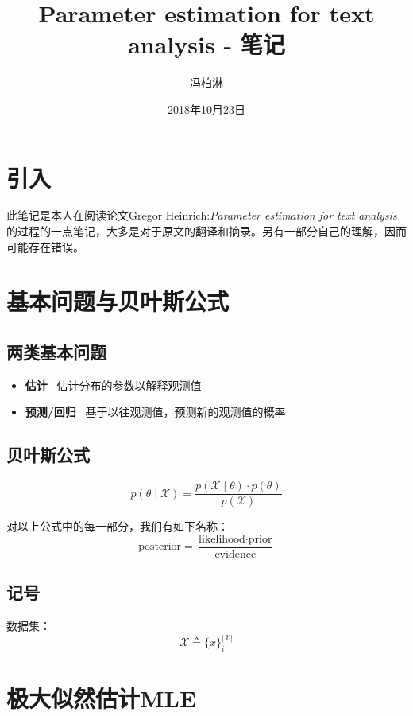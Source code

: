 \documentclass[utf8]{ctexart}
\begin{document}
\title{Parameter estimation for text analysis - 笔记}
\author{冯柏淋}
\date{2018年10月23日}

\maketitle
\tableofcontents
\newpage

\section{引入}
此笔记是本人在阅读论文Gregor Heinrich:\textit{Parameter estimation for text analysis}的过程的一点笔记，大多是对于原文的翻译和摘录。另有一部分自己的理解，因而可能存在错误。

\section{基本问题与贝叶斯公式}

\subsection{两类基本问题}

\begin{itemize}
	\item	\textbf{估计} \, 估计分布的参数以解释观测值 
	\item	\textbf{预测/回归} \, 基于以往观测值，预测新的观测值的概率 
\end{itemize}

\subsection{贝叶斯公式}
\begin{equation}\label{eq1}
p(\theta \mid \mathcal{X} ) = \frac{p(\mathcal{X} \mid \theta) \cdot p(\theta)}{p(\mathcal{X})}
\end{equation}

对以上公式中的每一部分，我们有如下名称：
\begin{equation}\label{eq2}
\text{posterior} = \frac{\text{likelihood} \cdot \text{prior}}{\text{evidence}}
\end{equation}

\subsection{记号}
数据集：$$	\mathcal{X} \triangleq \lbrace x \rbrace _{i}^{|\mathcal{X}|}	$$

\section{极大似然估计MLE}
\end{document}
